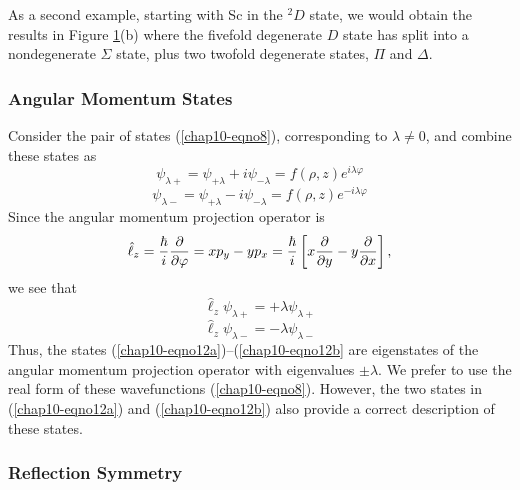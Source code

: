 As a second example, starting with Sc in the ${^2D}$ state, we would
obtain the results in Figure \ref{chap10-fig2}(b) where the fivefold
degenerate $D$ state has split into a nondegenerate $\Sigma$ state,
plus two twofold degenerate states, $\Pi$ and $\Delta$.


\begin{figure}
\caption{}
\label{chap10-fig2}
\end{figure}

\subsubsection{Angular Momentum States}

Consider the pair of states (\ref{chap10-eqno8}), corresponding to
$\lambda \not= 0$, and combine these states as
\begin{equation}
\psi_{\lambda +} = \psi_{+ \lambda} + i \psi_{-\lambda} = 
f ( \rho , z ) e^{i \lambda \varphi}
\label{chap10-eqno12a}
\end{equation}
\begin{equation}
\psi_{\lambda -} = \psi_{+ \lambda} - i \psi_{- \lambda} = 
f ( \rho , z ) e^{- i \lambda \varphi}
\label{chap10-eqno12b}
\end{equation}
Since the angular momentum projection operator is
\begin{equation}
{\hat{\ell}}_z = {\hbar \over i} {\partial \over \partial \varphi} = 
x p_y - yp_x = {\hbar \over i} \left[ x {\partial \over \partial 
y} - y {\partial \over \partial x} \right],
\end{equation}
we see that
\begin{equation}
{\hat{\ell}}_z \psi_{\lambda +} = + \lambda \psi_{\lambda +}
\end{equation}
\begin{equation}
{\hat{\ell}}_z \psi_{\lambda -} = - \lambda \psi_{\lambda -}
\end{equation}
Thus, the states (\ref{chap10-eqno12a})--(\ref{chap10-eqno12b} are
eigenstates of the angular momentum projection operator with
eigenvalues $\pm \lambda$.  We prefer to use the real form of these
wavefunctions (\ref{chap10-eqno8}).  However, the two states in
(\ref{chap10-eqno12a}) and (\ref{chap10-eqno12b}) also provide a
correct description of these states.

\subsubsection{Reflection Symmetry}

